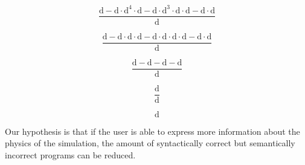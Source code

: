 \documentclass{beamer}
\begin{document}
\begin{frame}[fragile]
  \begin{equation*}
    \frac{\text{d} - \text{d} \cdot \text{d}^4 \cdot \text{d} - \text{d} \cdot \text{d}^3 \cdot \text{d} \cdot \text{d} - \text{d} \cdot \text{d}}
         {\text{d}}
  \end{equation*}
\end{frame}

\begin{frame}[fragile]
  \begin{equation*}
    \frac{\text{d} - \text{d} \cdot \text{d} \cdot \text{d} - \text{d} \cdot \text{d} \cdot \text{d} \cdot \text{d} - \text{d} \cdot \text{d}}
         {\text{d}}
  \end{equation*}
\end{frame}

\begin{frame}[fragile]
  \begin{equation*}
    \frac{\text{d} - \text{d} - \text{d} - \text{d}}
         {\text{d}}
  \end{equation*}
\end{frame}

\begin{frame}[fragile]
  \begin{equation*}
    \frac{\text{d}}
         {\text{d}}
  \end{equation*}
\end{frame}

\begin{frame}[fragile]
  \begin{equation*}
    \text{d}
  \end{equation*}
\end{frame}

\begin{frame}[fragile]
  Our hypothesis is that if the user is able to express more information about the
  physics of the simulation, the amount of syntactically correct but semantically incorrect programs can be reduced.
\end{frame}

\end{document}
